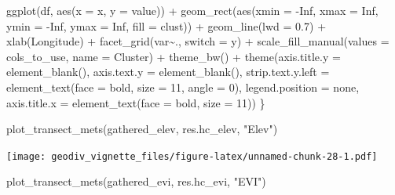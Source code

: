 \documentclass[
]{article}
\newenvironment{Shaded}{\begin{snugshade}}{\end{snugshade}}
\newcommand{\AttributeTok}[1]{\textcolor[rgb]{0.77,0.63,0.00}{#1}}
\newcommand{\ConstantTok}[1]{\textcolor[rgb]{0.00,0.00,0.00}{#1}}
\newcommand{\DecValTok}[1]{\textcolor[rgb]{0.00,0.00,0.81}{#1}}
\newcommand{\FloatTok}[1]{\textcolor[rgb]{0.00,0.00,0.81}{#1}}
\newcommand{\FunctionTok}[1]{\textcolor[rgb]{0.00,0.00,0.00}{#1}}
\newcommand{\NormalTok}[1]{#1}
\newcommand{\SpecialCharTok}[1]{\textcolor[rgb]{0.00,0.00,0.00}{#1}}
\newcommand{\StringTok}[1]{\textcolor[rgb]{0.31,0.60,0.02}{#1}}
\begin{document}
\begin{Shaded}
\begin{Highlighting}[]
  \FunctionTok{ggplot}\NormalTok{(df, }\FunctionTok{aes}\NormalTok{(}\AttributeTok{x =}\NormalTok{ x, }\AttributeTok{y =}\NormalTok{ value)) }\SpecialCharTok{+} 
    \FunctionTok{geom\_rect}\NormalTok{(}\FunctionTok{aes}\NormalTok{(}\AttributeTok{xmin =} \SpecialCharTok{{-}}\ConstantTok{Inf}\NormalTok{, }\AttributeTok{xmax =} \ConstantTok{Inf}\NormalTok{, }\AttributeTok{ymin =} \SpecialCharTok{{-}}\ConstantTok{Inf}\NormalTok{, }\AttributeTok{ymax =} \ConstantTok{Inf}\NormalTok{, }
                  \AttributeTok{fill =}\NormalTok{ clust)) }\SpecialCharTok{+}
    \FunctionTok{geom\_line}\NormalTok{(}\AttributeTok{lwd =} \FloatTok{0.7}\NormalTok{) }\SpecialCharTok{+}
    \FunctionTok{xlab}\NormalTok{(}\StringTok{\textquotesingle{}Longitude\textquotesingle{}}\NormalTok{) }\SpecialCharTok{+}
    \FunctionTok{facet\_grid}\NormalTok{(var}\SpecialCharTok{\textasciitilde{}}\NormalTok{., }\AttributeTok{switch =} \StringTok{\textquotesingle{}y\textquotesingle{}}\NormalTok{) }\SpecialCharTok{+}
    \FunctionTok{scale\_fill\_manual}\NormalTok{(}\AttributeTok{values =}\NormalTok{ cols\_to\_use, }\AttributeTok{name =} \StringTok{\textquotesingle{}Cluster\textquotesingle{}}\NormalTok{) }\SpecialCharTok{+}
    \FunctionTok{theme\_bw}\NormalTok{() }\SpecialCharTok{+}
    \FunctionTok{theme}\NormalTok{(}\AttributeTok{axis.title.y =} \FunctionTok{element\_blank}\NormalTok{(),}
          \AttributeTok{axis.text.y =} \FunctionTok{element\_blank}\NormalTok{(),}
          \AttributeTok{strip.text.y.left =} \FunctionTok{element\_text}\NormalTok{(}\AttributeTok{face =} \StringTok{\textquotesingle{}bold\textquotesingle{}}\NormalTok{, }\AttributeTok{size =} \DecValTok{11}\NormalTok{, }\AttributeTok{angle =} \DecValTok{0}\NormalTok{),}
          \AttributeTok{legend.position =} \StringTok{\textquotesingle{}none\textquotesingle{}}\NormalTok{,}
          \AttributeTok{axis.title.x =} \FunctionTok{element\_text}\NormalTok{(}\AttributeTok{face =} \StringTok{\textquotesingle{}bold\textquotesingle{}}\NormalTok{, }\AttributeTok{size =} \DecValTok{11}\NormalTok{))}
\NormalTok{\}}

\FunctionTok{plot\_transect\_mets}\NormalTok{(gathered\_elev, res.hc\_elev, }\StringTok{"Elev"}\NormalTok{)}
\end{Highlighting}
\end{Shaded}

\texttt{[image: geodiv\_vignette\_files/figure-latex/unnamed-chunk-28-1.pdf]}

\begin{Shaded}
\begin{Highlighting}[]
\FunctionTok{plot\_transect\_mets}\NormalTok{(gathered\_evi, res.hc\_evi, }\StringTok{"EVI"}\NormalTok{)}
\end{Highlighting}
\end{Shaded}
\end{document}
